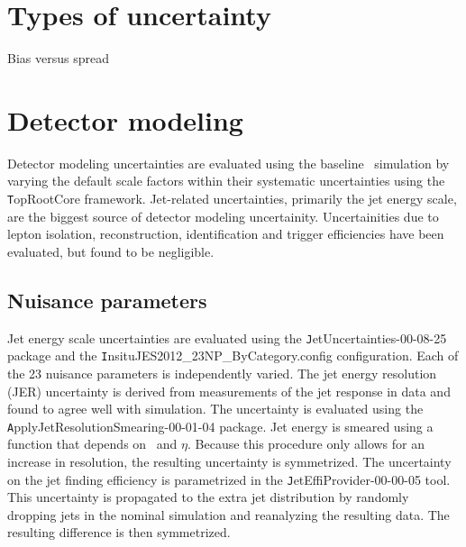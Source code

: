 \section{Types of uncertainty}
Bias versus spread

\section{Detector modeling}
Detector modeling uncertainties are evaluated using the baseline \ttbar\ simulation by varying the
default scale factors within their systematic uncertainties using the {\texttt TopRootCore} framework. Jet-related uncertainties, primarily the jet energy scale, are the biggest source of detector modeling uncertainity. Uncertainities due to lepton isolation, reconstruction, identification and trigger efficiencies have been evaluated, but found to be negligible. 


\subsection{Nuisance parameters}
\label{ss:np}
Jet energy scale uncertainties are evaluated using the {\texttt JetUncertainties-00-08-25} package and the 
{\texttt InsituJES2012\_23NP\_ByCategory.config} configuration.
Each of the 23 nuisance parameters is independently varied.
The jet energy resolution (JER) uncertainty is derived from measurements of the jet response in data and found to agree well with simulation. The uncertainty is evaluated using the {\texttt ApplyJetResolutionSmearing-00-01-04} package.  Jet energy is smeared using
a function that depends on  \pt\ and $\eta$.    Because this procedure only allows for an increase in resolution, 
the resulting uncertainty is symmetrized.
The uncertainty on the jet finding efficiency is parametrized in the  {\texttt JetEffiProvider-00-00-05} tool.
This uncertainty is propagated to the extra jet distribution by randomly dropping jets in the nominal simulation
and reanalyzing the resulting data.  The resulting difference is then symmetrized. 


